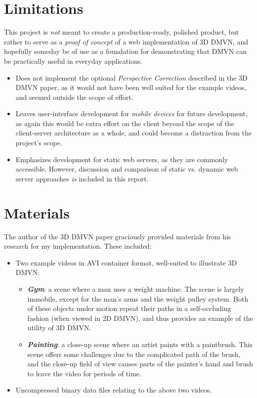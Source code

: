 \section{Limitations}
This project is \emph{not} meant to create a production-ready, polished product, but rather to serve as a \emph{proof of concept} of a web implementation of 3D DMVN, and hopefully someday be of use as a foundation for demonstrating that DMVN can be practically useful in everyday applications.
\begin{itemize}
    \item Does not implement the optional \emph{Perspective Correction} described in the 3D DMVN paper, as it would not have been well suited for the example videos, and seemed outside the scope of effort.
    \item Leaves user-interface development for \emph{mobile devices}\cite{fatfinger} for future development, as again this would be extra effort on the client beyond the scope of the client-server architecture as a whole, and could become a distraction from the project's scope.
    \item Emphasizes development for static web servers, as they are commonly accessible. However, discussion and comparison of static vs. dynamic web server approaches \emph{is} included in this report.
\end{itemize}

\section{Materials}
The author of the 3D DMVN paper graciously provided materials from his research for my implementation. These included:
\begin{itemize}
    \item Two example videos in AVI container format, well-suited to illustrate 3D DMVN:
    \begin{itemize}
    \item \textbf{\emph{Gym}}: a scene where a man uses a weight machine. The scene is largely immobile, except for the man's arms and the weight pulley system. Both of these objects under motion repeat their paths in a self-occluding fashion (when viewed in 2D DMVN), and thus provides an example of the utility of 3D DMVN.
    \item \textbf{\emph{Painting}}: a close-up scene where an artist paints with a paintbrush. This scene offers some challenges due to the complicated path of the brush, and the close-up field of view causes parts of the painter's hand and brush to leave the video for periods of time.
    \end{itemize}
    \item Uncompressed binary data files relating to the above two videos.
\end{itemize}

